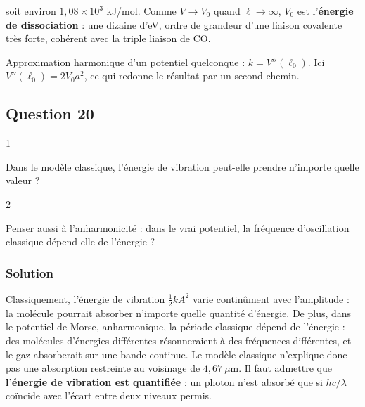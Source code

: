 \documentclass[11pt,a4paper]{article}
\begin{document}
soit environ \(1{,}08\times10^3\) kJ/mol. Comme \(V\to V_0\) quand \(\ell\to\infty\), \(V_0\) est l'\textbf{énergie de dissociation} : une dizaine d'eV, ordre de grandeur d'une liaison covalente très forte, cohérent avec la triple liaison de CO.

\begin{methode}

Approximation harmonique d'un potentiel quelconque : \(k = V''(\ell_0)\). Ici \(V''(\ell_0) = 2V_0a^2\), ce qui redonne le résultat par un second chemin.

\end{methode}

\hypertarget{question-20}{%
\subsection{Question 20}\label{question-20}}

\begin{indication}{1}

Dans le modèle classique, l'énergie de vibration peut-elle prendre n'importe quelle valeur ?

\end{indication}

\begin{indication}{2}

Penser aussi à l'anharmonicité : dans le vrai potentiel, la fréquence d'oscillation classique dépend-elle de l'énergie ?

\end{indication}

\hypertarget{solution-19}{%
\subsubsection{Solution}\label{solution-19}}

Classiquement, l'énergie de vibration \(\frac12kA^2\) varie continûment avec l'amplitude : la molécule pourrait absorber n'importe quelle quantité d'énergie. De plus, dans le potentiel de Morse, anharmonique, la période classique dépend de l'énergie : des molécules d'énergies différentes résonneraient à des fréquences différentes, et le gaz absorberait sur une bande continue. Le modèle classique n'explique donc pas une absorption restreinte au voisinage de \(4{,}67\ \mu\text{m}\). Il faut admettre que \textbf{l'énergie de vibration est quantifiée} : un photon n'est absorbé que si \(hc/\lambda\) coïncide avec l'écart entre deux niveaux permis.
\end{document}

